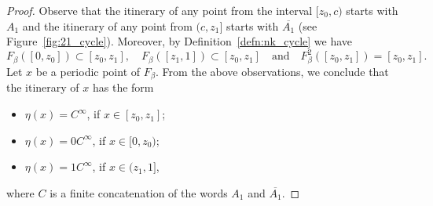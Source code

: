 \documentclass[10pt,reqno]{amsart}
\theoremstyle{plain}
\theoremstyle{assumption}
\theoremstyle{notation}
\theoremstyle{claim}
\theoremstyle{conj}
\theoremstyle{theorem}
\theoremstyle{proposition}
\theoremstyle{corollary}
\begin{document}
\begin{proof}
Observe that the itinerary of any point from the interval $[z_0,c)$ starts with $A_1$ and the itinerary of any point from $(c,z_1]$ starts with $\overline{A_1}$ (see Figure~\ref{fig:21_cycle}). Moreover, by Definition~\ref{defn:nk_cycle} we have 
$$
F_{\beta}([0,z_0])\subset[z_0,z_1],\quad F_{\beta}([z_1,1])\subset[z_0,z_1]\quad\text{and}\quad F^2_{\beta}([z_0,z_1])=[z_0,z_1].
$$
Let $x$ be a periodic point of $F_{\beta}$. From the above observations, we conclude that the itinerary of $x$ has the form
\begin{itemize}
    \item $\eta(x)=C^\infty$, if $x\in[z_0,z_1]$;
    \item $\eta(x)=0C^\infty$, if $x\in[0,z_0)$;
    \item $\eta(x)=1C^\infty$, if $x\in(z_1,1]$,
\end{itemize}
where $C$ is a finite concatenation of the words $A_1$ and $\overline{A_1}$.
\end{proof}
\end{document}
